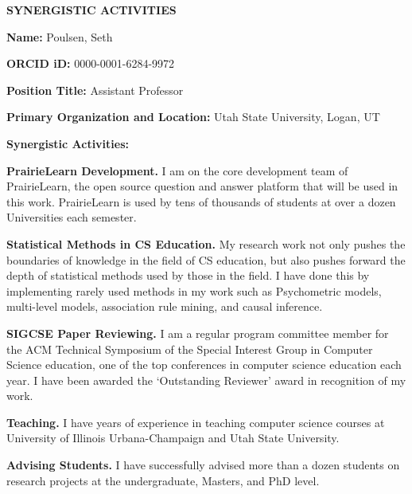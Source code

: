 \documentclass[12pt]{article}
\begin{document}
\textbf{SYNERGISTIC ACTIVITIES}

\textbf{Name: }Poulsen, Seth

\textbf{ORCID iD: }0000-0001-6284-9972

\textbf{Position Title: }Assistant Professor

\textbf{Primary Organization and Location: }Utah State University, Logan, UT

\textbf{Synergistic Activities:}

\textbf{PrairieLearn Development.} I am on the core development team of PrairieLearn, the open source question and answer platform that will be used in this work. PrairieLearn is used by tens of thousands of students at over a dozen Universities each semester.

\textbf{Statistical Methods in CS Education.} My research work not only pushes the boundaries of knowledge in the field of CS education, but also pushes forward the depth of statistical methods used by those in the field. I have done this by implementing rarely used methods in my work such as Psychometric models, multi-level models, association rule mining, and causal inference.

\textbf{SIGCSE Paper Reviewing.} I am a regular program committee member for the ACM Technical Symposium of the Special Interest Group in Computer Science education, one of the top conferences in computer science education each year.  I have been awarded the `Outstanding Reviewer' award in recognition of my work.

\textbf{Teaching.} I have years of experience in teaching computer science courses at University of Illinois Urbana-Champaign and Utah State University.

\textbf{Advising Students.} I have successfully advised more than a dozen students on research projects at the undergraduate, Masters, and PhD level.
\end{document}

